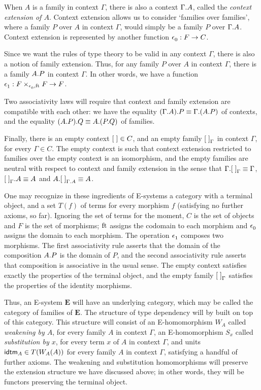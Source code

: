 When $A$ is a family in context $\Gamma$, there is also a context $\ctxext{\Gamma}{A}$,
called the \emph{context extension of $A$}. Context extension allows us to consider
`families over families', where a family $P$ over $A$ in context $\Gamma$, would
simply be a family $P$ over $\ctxext{\Gamma}{A}$. Context extension is represented
by another function $\epsilon_{0}^{} : F\to C$.

Since we want the rules of
type theory to be valid in any context $\Gamma$, there is also a notion of family
extension. Thus, for any family $P$ over $A$ in context $\Gamma$, there is a
family $\ctxext{A}{P}$ in context $\Gamma$. In other words, we have a function
$\epsilon_{1}^{} : F\times_{\epsilon_{0}^{},\mathrm{ft}_{}} F\to F$. 

Two associativity laws will require
that context and family extension are compatible with each other: we have
the equality $\ctxext{{\Gamma}{A}}{P}\jdeq\ctxext{\Gamma}{{A}{P}}$ of contexts,
and the equality $\ctxext{{A}{P}}{Q}\jdeq\ctxext{A}{{P}{Q}}$ of families.

Finally, there is an empty context ${[\;]}\in C$, and an empty family ${[\;]}_{\Gamma}$
in context $\Gamma$, for every $\Gamma\in C$. The empty context is such that context extension
restricted to families over the empty context is an isomorphism, and the empty
families are neutral with respect to context and family extension in the sense
that $\ctxext{\Gamma}{\emptyf[\Gamma]}\jdeq\Gamma$, $\ctxext{\emptyf[\Gamma]}{A}
\jdeq A$ and $\ctxext{A}{\emptyf[\ctxext{\Gamma}{A}]}\jdeq A$. 

One may recognize in these ingredients of E-systems a category with a
terminal object, and a set $T(f)$ of terms for every morphism $f$ (satisfying
no further axioms, so far). Ignoring the set of terms for the moment, $C$ is
the set of objects and $F$ is the set of morphisms; $\mathrm{ft}_{}$ assigns the codomain
to each morphism and $\epsilon_{0}^{}$ assigns the domain to each  morphism. The
operation $\epsilon_{1}^{}$ composes two morphisms. The first associativity rule
asserts that the domain of the composition $\ctxext{A}{P}$ is the domain of
$P$, and the second associativity rule asserts that composition is associative
in the usual sense. The empty context satisfies exactly the properties of the
terminal object, and the empty family ${[\;]}_{\Gamma}$ satisfies the properties
of the identity morphisms. 

Thus, an E-system $\mathbf{E}$ will have an underlying category, which may be called the
category of families of $\mathbf{E}$. The structure of type dependency will by
built on top of this category. This structure will consist of an E-homomorphism
$W_A$ called \emph{weakening by $A$}, for every family $A$ in context $\Gamma$,
an E-homomorphism $S_x$ called \emph{substitution by $x$}, for every term
$x$ of $A$ in context $\Gamma$, and units $\idtm{A}\in T(W_A(A))$ for every
family $A$ in context $\Gamma$, satisfying a handful of further axioms. 
The weakening and substitution homomorphisms
will preserve the extension structure we have discussed above; in other words,
they will be functors preserving the terminal object. 

